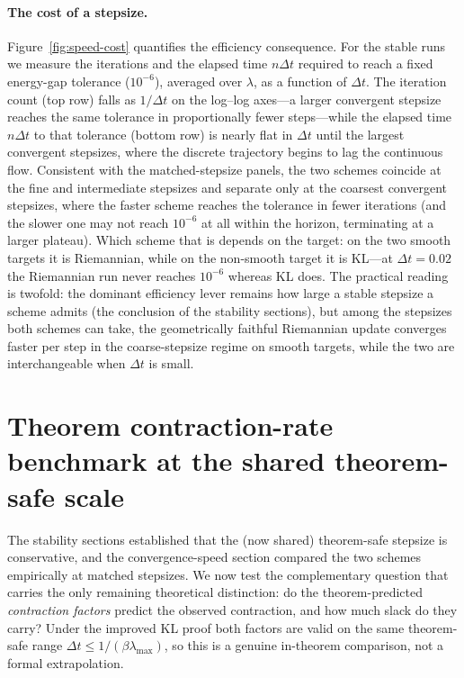 \documentclass[11pt]{article}
\begin{document}
\paragraph{The cost of a stepsize.}
Figure~\ref{fig:speed-cost} quantifies the efficiency consequence. For the stable
runs we measure the iterations and the elapsed time $n\Delta t$ required to reach a fixed
energy-gap tolerance ($10^{-6}$), averaged over $\lambda$, as a function of
$\Delta t$. The iteration count (top row) falls as $1/\Delta t$ on the log--log
axes---a larger convergent stepsize reaches the same tolerance in proportionally
fewer steps---while the elapsed time $n\Delta t$ to that tolerance (bottom row) is nearly
flat in $\Delta t$ until the largest convergent stepsizes, where the discrete
trajectory begins to lag the continuous flow. Consistent with the matched-stepsize
panels, the two schemes coincide at the fine and intermediate stepsizes and
separate only at the coarsest convergent stepsizes, where the faster scheme
reaches the tolerance in fewer iterations (and the slower one may not reach
$10^{-6}$ at all within the horizon, terminating at a larger plateau). Which
scheme that is depends on the target: on the two smooth targets it is Riemannian,
while on the non-smooth target it is KL---at $\Delta t=0.02$ the Riemannian run never reaches
$10^{-6}$ whereas KL does. The practical reading
is twofold: the dominant efficiency lever remains how large a stable stepsize a
scheme admits (the conclusion of the stability sections), but among the stepsizes both
schemes can take, the geometrically faithful Riemannian update converges faster
per step in the coarse-stepsize regime on smooth targets, while the two are
interchangeable when $\Delta t$ is small.

\section{Theorem contraction-rate benchmark at the shared theorem-safe scale}\label{sec:rate}

The stability sections established that the (now shared) theorem-safe stepsize is
conservative, and the convergence-speed section compared the two schemes
empirically at matched stepsizes. We now test the complementary question that
carries the only remaining theoretical distinction: do the theorem-predicted
\emph{contraction factors} predict the observed contraction, and how much slack do
they carry? Under the improved KL proof both factors are valid on the same
theorem-safe range $\Delta t\le1/(\beta\lambda_{\max})$, so this is a genuine
in-theorem comparison, not a formal extrapolation.
\end{document}
